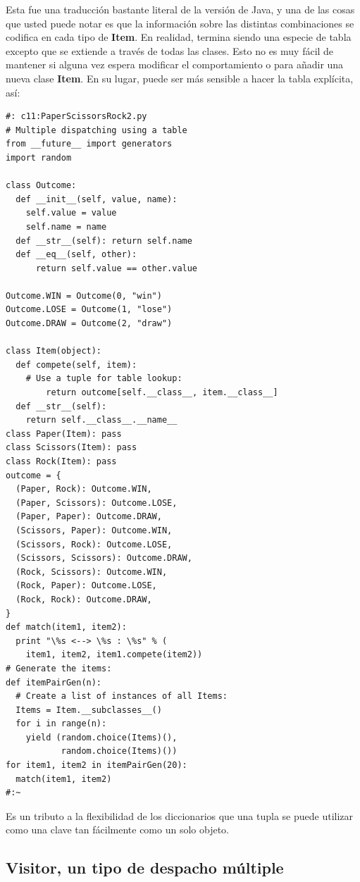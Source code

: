 \documentclass{article}
\begin{document}
Esta fue una traducción bastante literal de la versión de Java, y una de las cosas que usted puede notar es que la información sobre las distintas combinaciones se codifica en cada tipo de \textbf{Item}. En realidad, termina siendo una especie de tabla excepto que se extiende a través de todas las clases. Esto no es muy fácil de mantener si alguna vez espera modificar el comportamiento o para añadir una nueva clase \textbf{Item}. En su lugar, puede ser más sensible a hacer la tabla explícita, así:  \newline

\begin{lstlisting} 
#: c11:PaperScissorsRock2.py 
# Multiple dispatching using a table 
from __future__ import generators 
import random 

class Outcome: 
  def __init__(self, value, name):  
    self.value = value 
    self.name = name 
  def __str__(self): return self.name  
  def __eq__(self, other): 
      return self.value == other.value 
      
Outcome.WIN = Outcome(0, "win") 
Outcome.LOSE = Outcome(1, "lose") 
Outcome.DRAW = Outcome(2, "draw") 

class Item(object): 
  def compete(self, item): 
    # Use a tuple for table lookup: 
        return outcome[self.__class__, item.__class__] 
  def __str__(self):  
    return self.__class__.__name__  
class Paper(Item): pass 
class Scissors(Item): pass 
class Rock(Item): pass 
outcome = { 
  (Paper, Rock): Outcome.WIN, 
  (Paper, Scissors): Outcome.LOSE, 
  (Paper, Paper): Outcome.DRAW, 
  (Scissors, Paper): Outcome.WIN, 
  (Scissors, Rock): Outcome.LOSE, 
  (Scissors, Scissors): Outcome.DRAW, 
  (Rock, Scissors): Outcome.WIN, 
  (Rock, Paper): Outcome.LOSE, 
  (Rock, Rock): Outcome.DRAW, 
} 
def match(item1, item2): 
  print "\%s <--> \%s : \%s" % ( 
    item1, item2, item1.compete(item2)) 
# Generate the items: 
def itemPairGen(n): 
  # Create a list of instances of all Items: 
  Items = Item.__subclasses__() 
  for i in range(n): 
    yield (random.choice(Items)(),  
           random.choice(Items)()) 
for item1, item2 in itemPairGen(20): 
  match(item1, item2) 
#:~ 
\end{lstlisting}

Es un tributo a la flexibilidad de los diccionarios que una tupla se puede utilizar como una clave tan fácilmente como un solo objeto. \newpage

\subsection{Visitor, un tipo de despacho múltiple}
\end{document}
